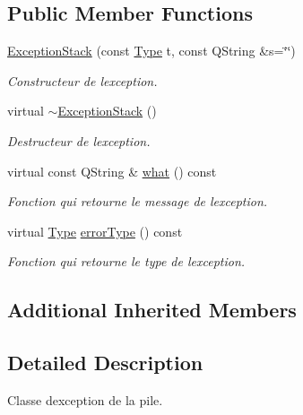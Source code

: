 \subsection*{Public Member Functions}
\begin{DoxyCompactItemize}
\item 
\hyperlink{class_exception_stack_a3dbb55d821b2b7a6071fbdab8691d624}{Exception\+Stack} (const \hyperlink{class_exception_stack_a79d7356c90bf8e48387a32723e7fe298}{Type} t, const Q\+String \&s=\char`\"{}\char`\"{})
\begin{DoxyCompactList}\small\item\em Constructeur de l\textquotesingle{}exception. \end{DoxyCompactList}\item 
virtual \hyperlink{class_exception_stack_a88cafb1273ee7b0ba1150ec03760cf26}{$\sim$\+Exception\+Stack} ()\hypertarget{class_exception_stack_a88cafb1273ee7b0ba1150ec03760cf26}{}\label{class_exception_stack_a88cafb1273ee7b0ba1150ec03760cf26}

\begin{DoxyCompactList}\small\item\em Destructeur de l\textquotesingle{}exception. \end{DoxyCompactList}\item 
virtual const Q\+String \& \hyperlink{class_exception_stack_a8e0dbc0a0c4077e5f1c873143e42d162}{what} () const 
\begin{DoxyCompactList}\small\item\em Fonction qui retourne le message de l\textquotesingle{}exception. \end{DoxyCompactList}\item 
virtual \hyperlink{class_exception_stack_a79d7356c90bf8e48387a32723e7fe298}{Type} \hyperlink{class_exception_stack_ac59bf40720ddb0a43d368d5bd94cbebc}{error\+Type} () const 
\begin{DoxyCompactList}\small\item\em Fonction qui retourne le type de l\textquotesingle{}exception. \end{DoxyCompactList}\end{DoxyCompactItemize}
\subsection*{Additional Inherited Members}


\subsection{Detailed Description}
Classe d\textquotesingle{}exception de la pile. 

